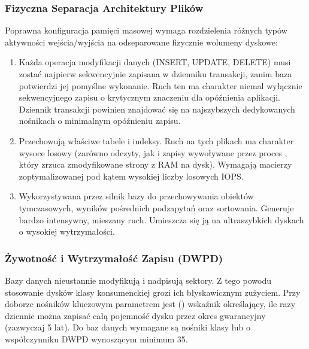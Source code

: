 \documentclass[a4paper,11pt,english,openany,oneside]{sphinxmanual}
\begin{document}
\subsubsection{Fizyczna Separacja Architektury Plików}
\label{\detokenize{rozdzial_2/rozdzial_21/index:fizyczna-separacja-architektury-plikow}}
\sphinxAtStartPar
Poprawna konfiguracja pamięci masowej wymaga rozdzielenia różnych typów aktywności wejścia/wyjścia na odseparowane fizycznie wolumeny dyskowe:
\begin{enumerate}
%
\item {} 
\sphinxAtStartPar
{} Każda operacja modyfikacji danych (INSERT, UPDATE, DELETE) musi zostać najpierw sekwencyjnie zapisana w dzienniku transakcji, zanim baza potwierdzi jej pomyślne wykonanie. Ruch ten ma charakter niemal wyłącznie sekwencyjnego zapisu o krytycznym znaczeniu dla opóźnienia aplikacji. Dziennik transakcji powinien znajdować się na najszybszych dedykowanych nośnikach o minimalnym opóźnieniu zapisu.

\item {} 
\sphinxAtStartPar
{} Przechowują właściwe tabele i indeksy. Ruch na tych plikach ma charakter wysoce losowy (zarówno odczyty, jak i zapisy wywoływane przez proces , który zrzuca zmodyfikowane strony z RAM na dysk). Wymagają macierzy zoptymalizowanej pod kątem wysokiej liczby losowych IOPS.

\item {} 
\sphinxAtStartPar
{} Wykorzystywana przez silnik bazy do przechowywania obiektów tymczasowych, wyników pośrednich podzapytań oraz sortowania. Generuje bardzo intensywny, mieszany ruch. Umieszcza się ją na ultra\sphinxhyphen{}szybkich dyskach o wysokiej wytrzymałości.

\end{enumerate}


\subsubsection{Żywotność i Wytrzymałość Zapisu (DWPD)}
\label{\detokenize{rozdzial_2/rozdzial_21/index:zywotnosc-i-wytrzymalosc-zapisu-dwpd}}
\sphinxAtStartPar
Bazy danych nieustannie modyfikują i nadpisują sektory. Z tego powodu stosowanie dysków klasy konsumenckiej grozi ich błyskawicznym zużyciem. Przy doborze nośników kluczowym parametrem jest  () \textendash{} wskaźnik określający, ile razy dziennie można zapisać całą pojemność dysku przez okres gwarancyjny (zazwyczaj 5 lat). Do baz danych wymagane są nośniki klasy  lub  o współczynniku DWPD wynoszącym minimum 3\sphinxhyphen{}5.
\end{document}

